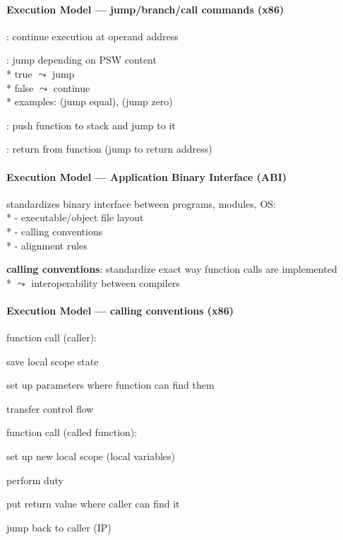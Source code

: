 \paragraph{Execution Model --- jump/branch/call commands (x86)}
\begin{items}
  \item {}: continue execution at operand address
  \item {}: jump depending on PSW content \\*
    true \( \leadsto \) jump \\*
    false \( \leadsto \) continue \\*
    examples:  (jump equal),  (jump zero)
  \item {}: push function to stack and jump to it
  \item {}: return from function (jump to return address)
\end{items}

\paragraph{Execution Model --- Application Binary Interface (ABI)}
\begin{items}
  \item standardizes binary interface between programs, modules, OS: \\*
    - executable/object file layout \\*
    - calling conventions \\*
    - alignment rules
  \item \textbf{calling conventions}: standardize exact way function calls are implemented \\*
    \( \leadsto \) interoperability between compilers
\end{items}

\paragraph{Execution Model --- calling conventions (x86)}
\begin{items}
  \item function call (caller):
  \begin{enumeration}
    \item save local scope state 
    \item set up parameters where function can find them
    \item transfer control flow
  \end{enumeration}
  \item function call (called function):
  \begin{enumeration}
    \item set up new local scope (local variables)
    \item perform duty
    \item put return value where caller can find it
    \item jump back to caller (IP)
  \end{enumeration}
\end{items}

